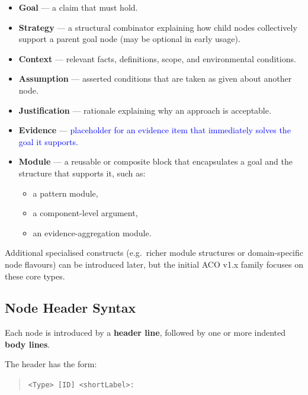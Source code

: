 \documentclass[11pt]{article}
\begin{document}
\begin{itemize}[leftmargin=2em]
  \item \textbf{Goal} --- a claim that must hold.
  \item \textbf{Strategy} --- a structural combinator explaining how child nodes collectively support a parent goal node (may be optional in early usage).
  \item \textbf{Context} --- relevant facts, definitions, scope, and environmental conditions.
  \item \textbf{Assumption} --- asserted conditions that are taken as given about another node.
  \item \textbf{Justification} --- rationale explaining why an approach is acceptable.
  \item \textbf{Evidence} --- \textcolor{blue}{placeholder for an evidence item that immediately solves the goal it supports.}
  \item \textbf{Module} --- a reusable or composite block that encapsulates a goal and the structure that supports it, such as:
  \begin{itemize}[leftmargin=1.5em]
    \item a pattern module,
    \item a component-level argument,
    \item an evidence-aggregation module.
  \end{itemize}
\end{itemize}

Additional specialised constructs (e.g.\ richer module structures or domain-specific node flavours) can be introduced later, but the initial ACO v1.x family focuses on these core types.

\subsection{Node Header Syntax}

Each node is introduced by a \textbf{header line}, followed by one or more indented \textbf{body lines}.

The header has the form:
\begin{quote}
\texttt{\textless Type\textgreater{} [ID] \textless shortLabel\textgreater:}
\end{quote}
\end{document}
